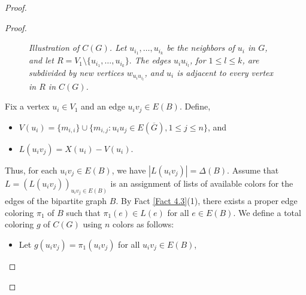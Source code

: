 \documentclass[12pt,reqno,a4paper]{amsart}
\theoremstyle{definition}
\theoremstyle{plain}
\begin{document}
\begin{proof}
\begin{proof}
\begin{figure}[h]
\caption{
\em Illustration of $C(G)$. Let $u_{i_1},\dots,u_{i_k}$ be the neighbors of $u_i$ in $G$, and let
$
R = V_1 \setminus \{u_{i_1}, \dots, u_{i_k}\}.
$
The edges $u_i u_{i_l}$, for $1 \le l \le k$, are subdivided by new vertices $w_{u_i u_{i_l}}$, and $u_i$ is adjacent to every vertex in $R$ in $C(G)$.}
\label{Figure 5}
\end{figure}



Fix a vertex $u_{i}\in V_{1}$ and an edge $u_{i}v_{j}\in E(B)$.
Define,

\begin{itemize}
    \item $V(u_{i})=\{m_{i,i}\}\cup\{m_{i,j}: u_{i}u_{j}\in E(\overline{G}), 1\leq j\leq n\}$, and 
    \vspace{2mm}
    
    \item $L(u_{i} v_{j})=X(u_{i})-V(u_{i})$.
\end{itemize}

Thus, for each $u_i v_j \in E(B)$, we have $|L(u_i v_j)| = \Delta(B)$.
Assume that $L=(L(u_{i} v_{j}))_{u_{i}v_{j}\in E(B)}$ is an assignment of lists of available colors for the edges of the bipartite graph $B$. By Fact \ref{Fact 4.3}(1), there exists a proper edge coloring $\pi_{1}$ of $B$ such that $\pi_{1}(e)\in L(e)$ for all $e\in E(B)$. 
We define a total coloring $g$ of $C(G)$ using $n$ colors as follows: 
\begin{itemize}
    \item Let $g(u_{i}v_{j})=\pi_{1}(u_{i}v_{j})$ for all $u_{i}v_{j}\in E(B)$, 
    \vspace{2mm}
    

\end{itemize}
\end{proof}
\end{proof}
\end{document}
